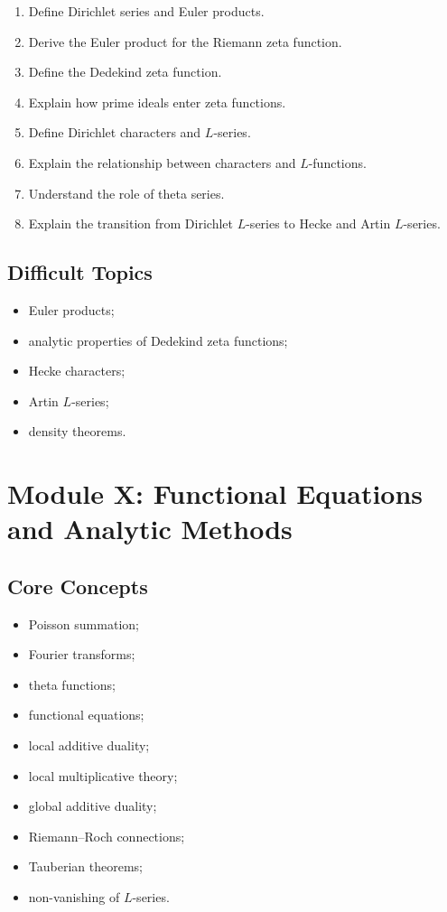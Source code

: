 \documentclass[11pt,a4paper]{article}
\begin{document}
\begin{enumerate}
    \item Define Dirichlet series and Euler products.
    \item Derive the Euler product for the Riemann zeta function.
    \item Define the Dedekind zeta function.
    \item Explain how prime ideals enter zeta functions.
    \item Define Dirichlet characters and \(L\)-series.
    \item Explain the relationship between characters and \(L\)-functions.
    \item Understand the role of theta series.
    \item Explain the transition from Dirichlet \(L\)-series to Hecke
    and Artin \(L\)-series.
\end{enumerate}

\subsection{Difficult Topics}

\begin{itemize}
    \item Euler products;
    \item analytic properties of Dedekind zeta functions;
    \item Hecke characters;
    \item Artin \(L\)-series;
    \item density theorems.
\end{itemize}

\section{Module X: Functional Equations and Analytic Methods}

\subsection{Core Concepts}

\begin{itemize}
    \item Poisson summation;
    \item Fourier transforms;
    \item theta functions;
    \item functional equations;
    \item local additive duality;
    \item local multiplicative theory;
    \item global additive duality;
    \item Riemann--Roch connections;
    \item Tauberian theorems;
    \item non-vanishing of \(L\)-series.
\end{itemize}
\end{document}
